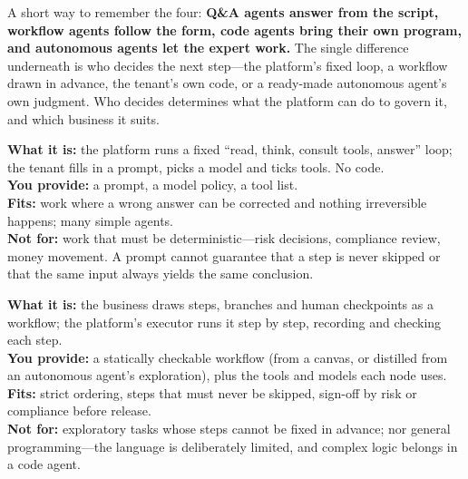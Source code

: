A short way to remember the four: \textbf{Q\&A agents answer from the script, workflow agents follow the form, code agents bring their own program, and autonomous agents let the expert work.} The single difference underneath is who decides the next step---the platform's fixed loop, a workflow drawn in advance, the tenant's own code, or a ready-made autonomous agent's own judgment. Who decides determines what the platform can do to govern it, and which business it suits.

\Needspace{12.6cm}
\begin{tcbraster}[
  raster columns=2,
  raster equal height=rows,
  raster column skip=4mm,
  raster row skip=4mm
]
\begin{tcolorbox}[
  title={T0 · Q\&A agent: answer from the script},
  colback=PrimaryLight,colframe=Primary,coltitle=white,
  fonttitle=\bfseries\sffamily,fontupper=\footnotesize,
  left=2.2mm,right=2.2mm,top=1mm,bottom=1mm
]
\textbf{What it is:} the platform runs a fixed ``read, think, consult tools, answer'' loop; the tenant fills in a prompt, picks a model and ticks tools. No code.\\
\textbf{You provide:} a prompt, a model policy, a tool list.\\
\textbf{Fits:} work where a wrong answer can be corrected and nothing irreversible happens; many simple agents.\\
\textbf{Not for:} work that must be deterministic---risk decisions, compliance review, money movement. A prompt cannot guarantee that a step is never skipped or that the same input always yields the same conclusion.
\end{tcolorbox}
\begin{tcolorbox}[
  title={T1 · Workflow agent: follow the form},
  colback=GreenLight,colframe=Green,coltitle=white,
  fonttitle=\bfseries\sffamily,fontupper=\footnotesize,
  left=2.2mm,right=2.2mm,top=1mm,bottom=1mm
]
\textbf{What it is:} the business draws steps, branches and human checkpoints as a workflow; the platform's executor runs it step by step, recording and checking each step.\\
\textbf{You provide:} a statically checkable workflow (from a canvas, or distilled from an autonomous agent's exploration), plus the tools and models each node uses.\\
\textbf{Fits:} strict ordering, steps that must never be skipped, sign-off by risk or compliance before release.\\
\textbf{Not for:} exploratory tasks whose steps cannot be fixed in advance; nor general programming---the language is deliberately limited, and complex logic belongs in a code agent.

\end{tcolorbox}
\end{tcbraster}
